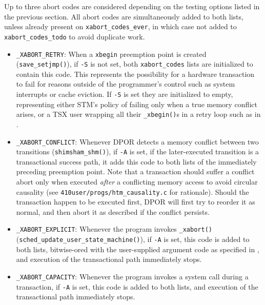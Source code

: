 Up to three abort codes are considered depending on the testing options listed in the previous section.
All abort codes are simultaneously added to both lists,
unless already present on {\tt xabort\_codes\_ever},
in which case not added to {\tt xabort\_codes\_todo} to avoid duplicate work.
\begin{itemize}
	\item {\tt \_XABORT\_RETRY}:
		When a {\tt xbegin} preemption point is created ({\tt save\_setjmp()}),
		if {\tt -S} is not set,
		both {\tt xabort\_codes} lists are initialized to contain this code.
		This represents the possibility for a hardware transaction to fail
		for reasons outside of the programmer's control such as system interrupts or cache eviction.
		If {\tt -S} is set they are initialized to empty,
		representing either STM's policy of failing only when a true memory conflict arises,
		or a TSX user wrapping all their {\tt \_xbegin()}s in a retry loop such as in \cite{sigbovik-htm}.
	\item {\tt \_XABORT\_CONFLICT}:
		Whenever DPOR detects a memory conflict between two transitions ({\tt shimsham\_shm()}),
		if {\tt -A} is set,
		if the later-executed transition is a transactional success path,
		it adds this code to both lists of the immediately preceding preemption point.
		Note that a transaction should suffer a conflict abort
		only when executed {\em after} a conflicting memory access
		to avoid circular causality
		(see {\tt 410user/progs/htm\_causality.c} for rationale).
		Should the transaction happen to be executed first,
		DPOR will first try to reorder it as normal,
		and then abort it as described if the conflict persists.
	\item {\tt \_XABORT\_EXPLICIT}:
		Whenever the program invokes {\tt \_xabort()} ({\tt sched\_update\_user\_\allowbreak{}state\_machine()}),
		if {\tt -A} is set,
		this code is added to both lists, bitwise-ored with the user-supplied argument code
		as specified in \cite{htm-gcc},
		and execution of the transactional path immediately stops.
	\item {\tt \_XABORT\_CAPACITY}:
		Whenever the program invokes a system call during a transaction,
		if {\tt -A} is set,
		this code is added to both lists,
		and execution of the transactional path immediately stops.
\end{itemize}

